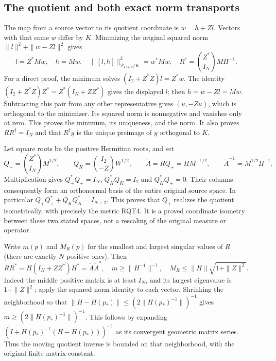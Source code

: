 \subsection{The quotient and both exact norm transports}
The map from a source vector to its quotient coordinate is
$w=h+Zl$.  Vectors with that same $w$ differ by $K$.
Minimizing the original squared norm
$\|l\|^2+\|w-Zl\|^2$ gives
\[
 l=Z^*Mw,\quad h=Mw,\quad
 \|[l,h]\|_{\mathcal P_{D+2}/K}^2=w^*Mw,\quad
 R^\dagger=\binom{Z^*}{I_N}MH^{-1}.
 \tag{RQT4}
\]
For a direct proof, the minimum solves
$(I_2+Z^*Z)l=Z^*w$.  The identity
$(I_2+Z^*Z)Z^*=Z^*(I_N+ZZ^*)$ gives the displayed $l$;
then $h=w-Zl=Mw$.  Subtracting this pair from any other
representative gives $(u,-Zu)$, which is orthogonal to the
minimizer.  Its squared norm is nonnegative and vanishes only
at zero.  This proves the minimum, its uniqueness, and the norm.
It also proves $RR^\dagger=I_N$ and that $R^\dagger y$ is
the unique preimage of $y$ orthogonal to $K$.

Let square roots be the positive Hermitian roots, and set
\[
 Q_+=\binom{Z^*}{I_N}M^{1/2},\qquad
 Q_K=\binom{I_2}{-Z}W^{1/2},\qquad
 \widetilde A=RQ_+=HM^{-1/2},\qquad
 \widetilde A^{-1}=M^{1/2}H^{-1}.
 \tag{RQT5}
\]
Multiplication gives $Q_+^*Q_+=I_N$, $Q_K^*Q_K=I_2$ and
$Q_K^*Q_+=0$.  Their columns consequently form an orthonormal
basis of the entire original source space.  In particular
$Q_+Q_+^*+Q_KQ_K^*=I_{N+2}$.  This proves that $Q_+$ realizes
the quotient isometrically, with precisely the metric RQT4.
It is a proved coordinate isometry between these two stated
spaces, not a rescaling of the original measure or operator.

Write $m(p)$ and $M_R(p)$ for the smallest and largest singular
values of $R$ (there are exactly $N$ positive ones).  Then
\[
 RR^*=H(I_N+ZZ^*)H^*=\widetilde A\widetilde A^*,\quad
 m\ge\|H^{-1}\|^{-1},\quad
 M_R\le\|H\|\sqrt{1+\|Z\|^2}.
 \tag{RQT6}
\]
Indeed the middle positive matrix is at least $I_N$, and its
largest eigenvalue is $1+\|Z\|^2$; apply the squared norm
identity to each vector.  Shrinking the neighborhood so that
$\|H-H(p_*)\|\le(2\|H(p_*)^{-1}\|)^{-1}$ gives
$m\ge(2\|H(p_*)^{-1}\|)^{-1}$.  This follows by expanding
$(I+H(p_*)^{-1}(H-H(p_*)))^{-1}$ as its convergent geometric
matrix series.  Thus the moving quotient inverse is bounded
on that neighborhood, with the original finite matrix constant.

